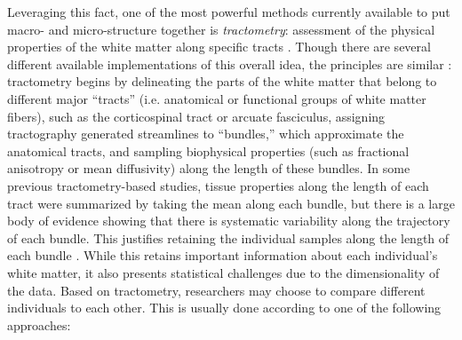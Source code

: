 Leveraging this fact, one of the most powerful methods currently
available to put macro- and micro-structure together is
\emph{tractometry}: assessment of the physical properties of the white
matter along specific tracts \cite{Bells2011-cf}. Though there are
several different available implementations of this overall idea,
the principles are similar \cite{yeatman2012tract, Yendiki2011-ay,
Wassermann2016-iv, ODonnell2009-uu}: tractometry begins by delineating
the parts of the white matter that belong to different major ``tracts''
(i.e. anatomical or functional groups of white matter fibers), such as
the corticospinal tract or arcuate fasciculus, assigning tractography
generated streamlines to ``bundles,'' which approximate the anatomical
tracts, and sampling biophysical properties (such as fractional
anisotropy or mean diffusivity) along the length of these bundles.
In some previous tractometry-based studies, tissue properties along
the length of each tract were summarized by taking the mean along
each bundle, but there is a large body of evidence showing that there
is systematic variability along the trajectory of each bundle. This
justifies retaining the individual samples along the length of each
bundle \cite{yeatman2012tract, colby2012, ODonnell2009-uu}. While this
retains important information about each individual's white matter, it
also presents statistical challenges due to the dimensionality of the
data. Based on tractometry, researchers may choose to compare different
individuals to each other. This is usually done according to one of the
following approaches:

